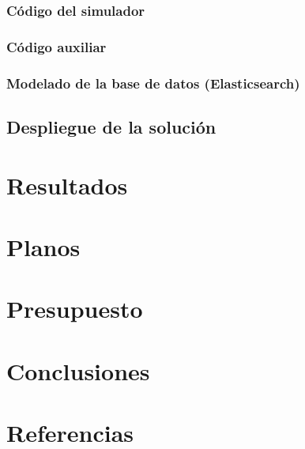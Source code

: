 \documentclass[12pt]{article}
\begin{document}
\subsubsection{Código del simulador}
\subsubsection{Código auxiliar}
\subsubsection{Modelado de la base de datos (Elasticsearch)}
\subsection{Despliegue de la solución}

\section{Resultados}

\section{Planos}

\section{Presupuesto}

\section{Conclusiones}

\section{Referencias}
\end{document}
